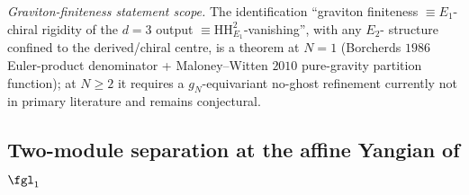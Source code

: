 \begin{theorem}[$c_L^{\mathrm{reduced}} = 24$ uniformly via volume
absorption]
\emph{Graviton-finiteness statement scope.} The identification
``graviton finiteness $\equiv E_1$-chiral rigidity of the $d=3$
output $\equiv \mathrm{HH}^2_{E_1}$-vanishing'', with any $E_2$-
structure confined to the derived/chiral centre, is a theorem at
$N = 1$
(Borcherds $1986$ Euler-product denominator +
Maloney--Witten $2010$ pure-gravity partition function); at
$N \geq 2$ it requires a $g_N$-equivariant no-ghost refinement
currently not in primary literature and remains conjectural.
\end{theorem}

\subsection{Two-module separation at the affine Yangian of $\fgl_1$}
\label{wn:subsec:second-pass-two-modules}

